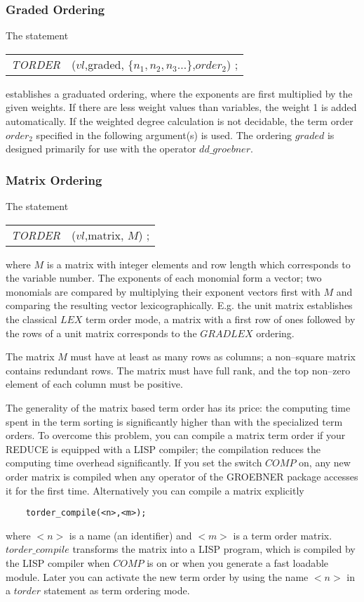 \subsubsection{Graded Ordering}
 
The statement
\begin{center}
\begin{tabular}{cl}
{\it TORDER} &($vl$,graded, $\{n_1,n_2,n_3 \ldots\}$,$order_2$) ; \\
\end{tabular}
\end{center}
establishes a graduated ordering, where the exponents are first
multiplied by the given weights. If there are less weight values than
variables, the weight 1 is added automatically. If the weighted
degree calculation is not decidable, the term order $order_2$ specified
in the following argument(s) is used.  The ordering $graded$ is designed
primarily for use with the operator $dd\_groebner$.


\subsubsection{Matrix Ordering}
 
The statement
\begin{center}
\begin{tabular}{cl}
{\it TORDER} &($vl$,matrix, $M$) ; \\
\end{tabular}
\end{center}
where $M$ is a matrix with integer elements and row length which
corresponds to the variable number. The exponents of each monomial
form a vector; two monomials are compared by multiplying their
exponent vectors first with $M$ and comparing the resulting vector
lexicographically. E.g. the unit matrix establishes the classical
$LEX$ term order mode, a matrix with a first row of ones followed
by the rows of a unit matrix corresponds to the $GRADLEX$ ordering.

The matrix $M$ must have at least as many rows as columns; a non--square
matrix contains redundant rows. The matrix must have full rank, and
the top non--zero element of each column must be positive.

The generality of the matrix based term order has its price: the
computing time spent in the term sorting is significantly higher
than with the specialized term orders. To overcome this problem,
you can compile a matrix term order
if your REDUCE is equipped with a LISP compiler; the
compilation reduces the computing time overhead significantly.
If you set the switch $COMP$ on, any new order matrix is compiled
when any operator of the GROEBNER package accesses it for the
first time. Alternatively you can compile a matrix explicitly
\begin{verbatim}
    torder_compile(<n>,<m>);
\end{verbatim}
where $<n>$ is a name (an identifier) and $<m>$ is a term order matrix.
$torder\_compile$ transforms the matrix into a LISP program, which
is compiled by the LISP compiler when $COMP$ is on or when you
generate a fast loadable module. Later you can activate the new term
order by using the name $<n>$ in a $torder$ statement as term ordering
mode.

